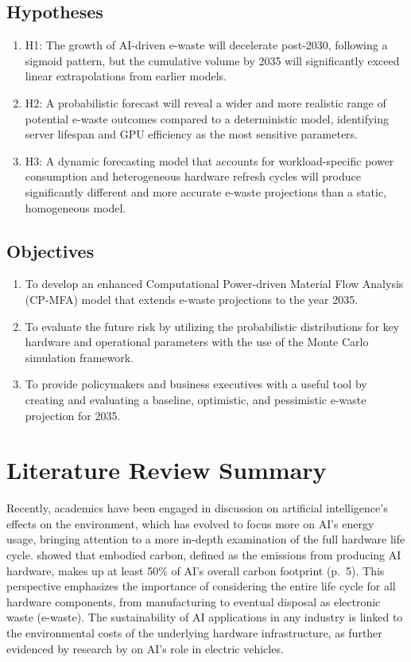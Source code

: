 \documentclass[a4paper, 12pt]{article}
\begin{document}
\subsection*{Hypotheses}
\begin{enumerate}
	\item H1: The growth of AI-driven e-waste will decelerate post-2030, following a sigmoid pattern, but the cumulative volume by 2035 will significantly exceed linear extrapolations from earlier models.
	\item H2: A probabilistic forecast will reveal a wider and more realistic range of potential e-waste outcomes compared to a deterministic model, identifying server lifespan and GPU efficiency as the most sensitive parameters.
	\item H3: A dynamic forecasting model that accounts for workload-specific power consumption and heterogeneous hardware refresh cycles will produce significantly different and more accurate e-waste projections than a static, homogeneous model.
\end{enumerate}

\subsection*{Objectives}
\begin{enumerate}
	\item To develop an enhanced Computational Power-driven Material Flow Analysis (CP-MFA) model that extends e-waste projections to the year 2035.
	\item To evaluate the future risk by utilizing the probabilistic distributions for key hardware and operational parameters with the use of the Monte Carlo simulation framework.
	\item To provide policymakers and business executives with a useful tool by creating and evaluating a baseline, optimistic, and pessimistic e-waste projection for 2035.
\end{enumerate}

\section{Literature Review Summary}
Recently, academics have been engaged in discussion on artificial intelligence's effects on the environment, which has evolved to focus more on AI's energy usage, bringing attention to a more in-depth examination of the full hardware life cycle. \citet{Wu2022} showed that embodied carbon, defined as the emissions from producing AI hardware, makes up at least 50\% of AI's overall carbon footprint (p.~5). This perspective emphasizes the importance of considering the entire life cycle for all hardware components, from manufacturing to eventual disposal as electronic waste (e-waste). The sustainability of AI applications in any industry is linked to the environmental costs of the underlying hardware infrastructure, as further evidenced by research by \citet{M.rauf2024} on AI's role in electric vehicles.
\end{document}
